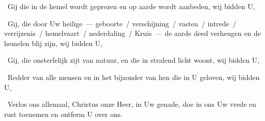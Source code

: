 \documentclass[12pt,twoside,a5paper]{article}
\begin{document}
\begin{halfparskip}
  \dd~Gij die in de hemel wordt geprezen en op aarde wordt aanbeden, wij bidden U,

  \liturgicallbracket\dd~Gij, die door Uw heilige~--- geboorte~/ verschijning~/ vasten~/ intrede~/ verrijzenis~/ hemelvaart~/ nederdaling~/ Kruis~--- de aarde deed verheugen en de hemelen blij zijn, wij bidden U,\liturgicalrbracket

  \dd~Gij, die onsterfelijk zijt van natuur, en die in stralend licht woont, wij bidden U,

  \liturgicallbracket\dd~Redder van alle mensen en in het bijzonder van hen die in U geloven, wij bidden U,\liturgicalrbracket

  \dd~Verlos ons allemaal, Christus onze Heer, in Uw genade, doe in ons Uw vrede en rust toenemen en ontferm U over ons.
\end{halfparskip}


\end{document}

